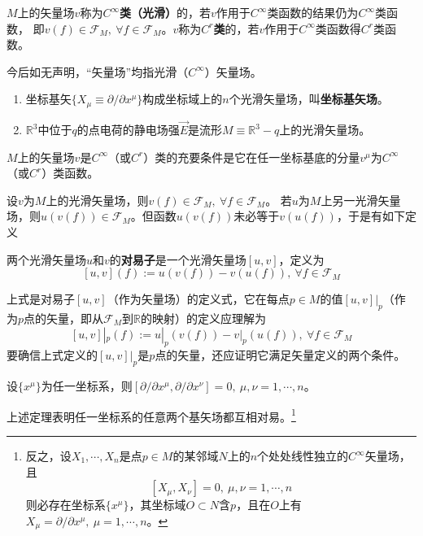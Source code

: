 \begin{definition}
$M$上的矢量场$v$称为\textbf{$C^\infty$类（光滑）}的，若$v$作用于$C^\infty$类函数的结果仍为$C^\infty$类函数，
即$v(f) \in \mathscr{F}_M, ~ \forall f \in \mathscr{F}_M$。$v$称为\textbf{$C^r$类}的，若$v$作用于$C^\infty$类函数得$C^r$类函数。
\end{definition}

今后如无声明，``矢量场''均指光滑（$C^\infty$）矢量场。

\begin{example}
\begin{enumerate}[（1）]
\item 坐标基矢$\{X_\mu \equiv \partial / \partial x^\mu\}$构成坐标域上的$n$个光滑矢量场，叫\textbf{坐标基矢场}。
\item $\mathbb{R}^3$中位于$q$的点电荷的静电场强$\vec{E}$是流形$M \equiv \mathbb{R}^3 - {q}$上的光滑矢量场。
\end{enumerate}
\end{example}

\begin{theorem}
$M$上的矢量场$v$是$C^\infty$（或$C^r$）类的充要条件是它在任一坐标基底的分量$v^\mu$为$C^\infty$（或$C^r$）类函数。
\end{theorem}

设$v$为$M$上的光滑矢量场，则$v(f) \in \mathscr{F}_M, ~ \forall f \in \mathscr{F}_M$。
若$u$为$M$上另一光滑矢量场，则$u(v(f)) \in \mathscr{F}_M$。但函数$u(v(f))$未必等于$v(u(f))$，于是有如下定义

\begin{definition}
两个光滑矢量场$u$和$v$的\textbf{对易子}是一个光滑矢量场$[u, v]$，定义为
$$[u, v](f) := u(v(f)) - v(u(f)), ~ \forall f \in \mathscr{F}_M$$
\end{definition}

\begin{note}
上式是对易子$[u, v]$（作为矢量场）的定义式，它在每点$p \in M$的值$[u, v]|_p$（作为$p$点的矢量，即从$\mathscr{F}_M$到$\mathbb{R}$的映射）的定义应理解为
$$[u, v]|_p(f) := u|_p(v(f)) - v|_p(u(f)), ~ \forall f \in \mathscr{F}_M$$
要确信上式定义的$[u, v]|_p$是$p$点的矢量，还应证明它满足矢量定义的两个条件。
\end{note}

\begin{theorem}
设$\{x^\mu\}$为任一坐标系，则$[\partial / \partial x^\mu, \partial / \partial x^\nu] = 0, ~ \mu,\nu = 1, \cdots, n$。
\end{theorem}

上述定理表明任一坐标系的任意两个基矢场都互相对易。\footnote{
反之，设$X_1, \cdots, X_n$是点$p \in M$的某邻域$N$上的$n$个处处线性独立的$C^\infty$矢量场，且
$$[X_\mu, X_\nu] = 0, ~ \mu, \nu = 1, \cdots, n$$
则必存在坐标系$\{x^\mu\}$，其坐标域$O \subset N$含$p$，且在$O$上有$X_\mu = \partial / \partial x^\mu, ~ \mu = 1, \cdots, n$。
}

